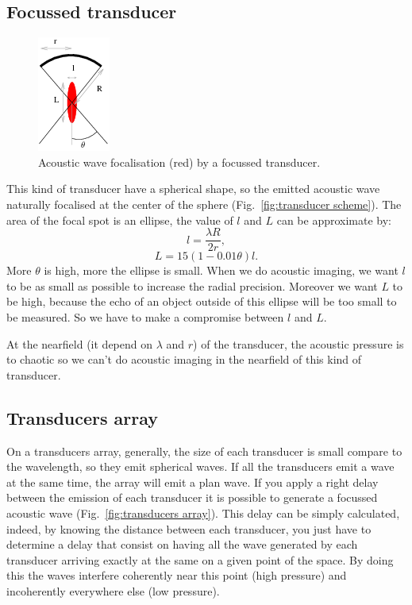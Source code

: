 \documentclass[a4paper,twoside,11pt]{article}
\begin{document}
\subsection{Focussed transducer}
\label{sec:Focussed transducer}

\begin{figure}[htb]
	\centering
		\includegraphics{image/transducer_scheme}
	\caption{Acoustic wave focalisation (red) by a focussed transducer.}
	\label{fig:transducer scheme}
\end{figure}

This kind of transducer have a spherical shape, so the emitted acoustic wave 
naturally focalised at the center of the sphere (Fig.~\ref{fig:transducer 
scheme}). The area of the focal spot is an ellipse, the value of $l$ and $L$ can 
be approximate by:
\begin{equation}
 l=\dfrac{\lambda R}{2r},
 \label{eq:l value}
\end{equation}
\begin{equation}
 L=15\left(1-0.01\theta\right)l.
 \label{eq:L value}
\end{equation}
More $\theta$ is high, more the ellipse is small. When we do acoustic imaging, 
we want $l$ to be as small as possible to increase the radial precision. 
Moreover we want $L$ to be high, because the echo of an object outside of this 
ellipse will be too small to be measured. So we have to make a compromise between 
$l$ and $L$.

At the nearfield (it depend on $\lambda$ and $r$) of the transducer, the 
acoustic pressure is to chaotic so we can't do acoustic imaging in the 
nearfield of this kind of transducer.

\subsection{Transducers array}
\label{sec:Transducers array}

On a transducers array, generally, the size of each transducer is small compare 
to the wavelength, so they emit spherical waves. If all the transducers emit a 
wave at the same time, the array will emit a plan wave. If you apply a right 
delay between the emission of each transducer it is possible to generate a 
focussed acoustic wave (Fig.~\ref{fig:transducers array}). This delay can be 
simply calculated, indeed, by knowing the distance between each transducer, you 
just have to determine a delay that consist on having all the wave generated by 
each transducer arriving exactly at the same on a given point of the space. By 
doing this the waves interfere coherently near this point (high pressure) and 
incoherently everywhere else (low pressure).
\end{document}
